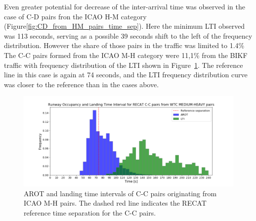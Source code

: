 Even greater potential for decrease of the inter-arrival time was observed in the case of C-D pairs fron the ICAO H-M category (Figure\ref{fig:CD_from_HM_pairs_time_sep}). Here the minimum LTI observed was 113 seconds, serving as a possible 39 seconds shift to the left of the frequency distribution. However the share of those pairs in the traffic was limited to 1.4\%\\

The C-C pairs formed from the ICAO M-H category were 11,1\% from the BIKF traffic with frequency distribution of the LTI shown in Figure~\ref{fig:CC_from_MH_pairs_time_sep}. The reference line in this case is again at 74 seconds, and the LTI frequency distribution curve was closer to the reference than in the cases above.
\begin{figure}[h]
    \centering
    \includegraphics[width=1\textwidth]{graphics/fig_CC_from_MH_pairs_time_sep.png}
    \caption[AROT and LTI of C-C pairs originating from ICAO M-H pairs]{AROT and landing time intervals of C-C pairs originating from ICAO M-H pairs. The dashed red line indicates the RECAT reference time separation for the C-C pairs.}
    \label{fig:CC_from_MH_pairs_time_sep}
\end{figure}

